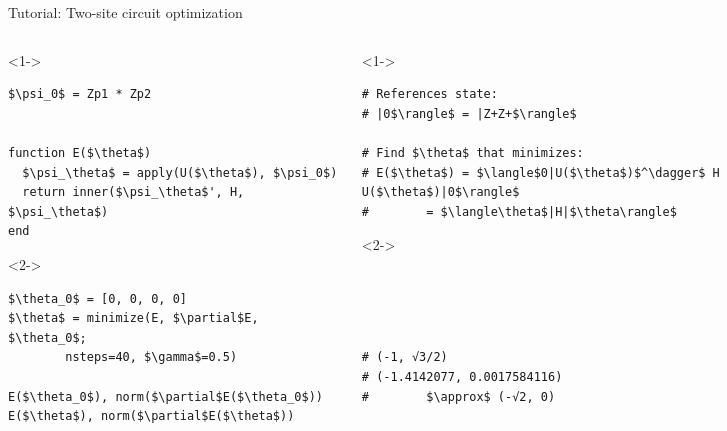 \begin{frame}[fragile]{Tutorial: Two-site circuit optimization}


\begin{columns}

\begin{column}{5cm}

\begin{onlyenv}<1->

\begin{lstlisting}[language=JuliaLocal, style=julia, mathescape, basicstyle=\small]
$\psi_0$ = Zp1 * Zp2


function E($\theta$)
  $\psi_\theta$ = apply(U($\theta$), $\psi_0$)
  return inner($\psi_\theta$', H, $\psi_\theta$)
end
\end{lstlisting}

\end{onlyenv}

\begin{onlyenv}<2->

\begin{lstlisting}[language=JuliaLocal, style=julia, mathescape, basicstyle=\small]
$\theta_0$ = [0, 0, 0, 0]
$\theta$ = minimize(E, $\partial$E, $\theta_0$;
        nsteps=40, $\gamma$=0.5)

E($\theta_0$), norm($\partial$E($\theta_0$))
E($\theta$), norm($\partial$E($\theta$))
 \end{lstlisting}

\end{onlyenv}

\end{column}

\begin{column}{5cm}

\begin{onlyenv}<1->

\begin{lstlisting}[style=julia, numbers=none, mathescape, basicstyle=\small]
# References state:
# |0$\rangle$ = |Z+Z+$\rangle$

# Find $\theta$ that minimizes:
# E($\theta$) = $\langle$0|U($\theta$)$^\dagger$ H U($\theta$)|0$\rangle$
#        = $\langle\theta$|H|$\theta\rangle$
 \end{lstlisting}

\end{onlyenv}

\begin{onlyenv}<2->

\begin{lstlisting}[style=julia, numbers=none, mathescape, basicstyle=\small]




# (-1, √3/2)
# (-1.4142077, 0.0017584116)
#        $\approx$ (-√2, 0)
\end{lstlisting}

\end{onlyenv}

\end{column}

\end{columns}

\end{frame}
